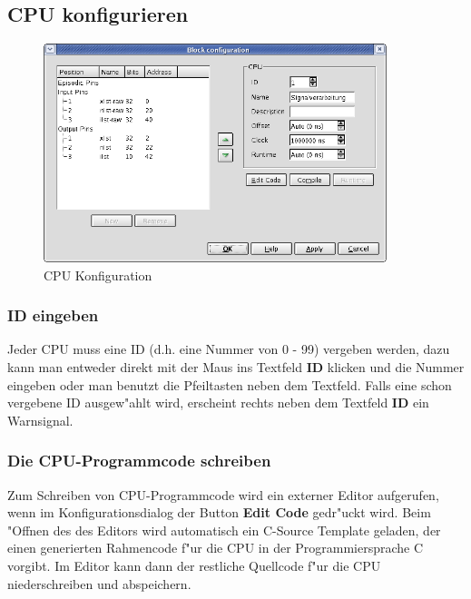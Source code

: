 \documentclass[a4paper,titlepage,12pt,ngerman]{scrbook}
\begin{document}
\newpage
\subsection{CPU konfigurieren}
\begin{figure}[htbp]

\begin{center}

\includegraphics[width=10cm]{CPUConfiguration}

\caption{CPU Konfiguration}\label{test}

\end{center}

\end{figure}
\subsubsection{ID eingeben}
Jeder CPU muss eine ID (d.h. eine Nummer von 0 - 99) vergeben werden, dazu kann man entweder direkt mit der Maus ins Textfeld {\bf ID} klicken und die Nummer eingeben oder man benutzt die Pfeiltasten neben dem Textfeld. Falls eine schon vergebene ID ausgew"ahlt wird, erscheint rechts neben dem Textfeld {\bf ID} ein Warnsignal.

\subsubsection{Die CPU-Programmcode schreiben}
Zum Schreiben von CPU-Programmcode wird ein externer Editor aufgerufen, wenn im Konfigurationsdialog der Button {\bf Edit Code} gedr"uckt wird. Beim "Offnen des des Editors wird automatisch ein C-Source Template geladen, der einen generierten Rahmencode f"ur die CPU in der Programmiersprache C vorgibt. Im Editor kann dann der restliche Quellcode f"ur die CPU niederschreiben und abspeichern.
\end{document}
